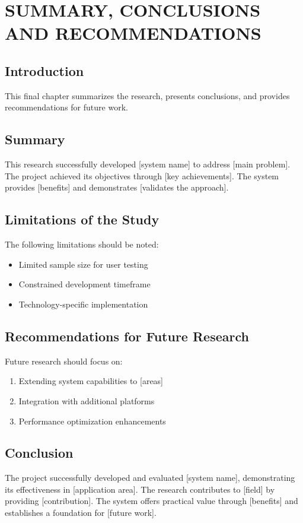 \documentclass[12pt,twoside]{report}
\begin{document}
\chapter{SUMMARY, CONCLUSIONS AND RECOMMENDATIONS}
\section{Introduction}
This final chapter summarizes the research, presents conclusions, and provides recommendations for future work.

\section{Summary}
This research successfully developed [system name] to address [main problem]. The project achieved its objectives through [key achievements]. The system provides [benefits] and demonstrates [validates the approach].

\section{Limitations of the Study}
The following limitations should be noted:
\begin{itemize}
    \item Limited sample size for user testing
    \item Constrained development timeframe
    \item Technology-specific implementation
\end{itemize}

\section{Recommendations for Future Research}
Future research should focus on:
\begin{enumerate}
    \item Extending system capabilities to [areas]
    \item Integration with additional platforms
    \item Performance optimization enhancements
\end{enumerate}

\section{Conclusion}
The project successfully developed and evaluated [system name], demonstrating its effectiveness in [application area]. The research contributes to [field] by providing [contribution]. The system offers practical value through [benefits] and establishes a foundation for [future work].
\end{document}
